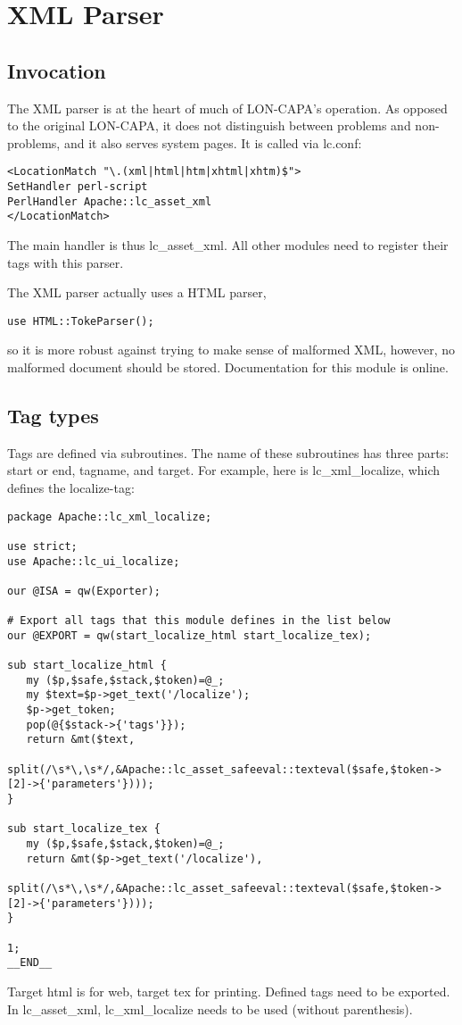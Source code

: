 \chapter{XML Parser}
\section{Invocation}
The XML parser is at the heart of much of LON-CAPA's operation. As opposed to the original LON-CAPA, it does not distinguish between problems and non-problems, and it also serves system pages. It is called via lc.conf:
\begin{verbatim}
<LocationMatch "\.(xml|html|htm|xhtml|xhtm)$">
SetHandler perl-script
PerlHandler Apache::lc_asset_xml
</LocationMatch>
\end{verbatim}
The main handler is thus lc\_asset\_xml. All other modules need to register their tags with this parser.

The XML parser actually uses a HTML parser,
\begin{verbatim}
use HTML::TokeParser();
\end{verbatim}
so it is more robust against trying to make sense of malformed XML, however, no malformed document should be stored. Documentation for this module is online.
\section{Tag types}
Tags are defined via subroutines. The name of these subroutines has three parts: start or end, tagname, and target. For example, here is lc\_xml\_localize, which defines the localize-tag:
\begin{verbatim}
package Apache::lc_xml_localize;

use strict;
use Apache::lc_ui_localize;

our @ISA = qw(Exporter);

# Export all tags that this module defines in the list below
our @EXPORT = qw(start_localize_html start_localize_tex);

sub start_localize_html {
   my ($p,$safe,$stack,$token)=@_;
   my $text=$p->get_text('/localize');
   $p->get_token;
   pop(@{$stack->{'tags'}});
   return &mt($text,
              split(/\s*\,\s*/,&Apache::lc_asset_safeeval::texteval($safe,$token->[2]->{'parameters'})));
}

sub start_localize_tex {
   my ($p,$safe,$stack,$token)=@_;
   return &mt($p->get_text('/localize'),
              split(/\s*\,\s*/,&Apache::lc_asset_safeeval::texteval($safe,$token->[2]->{'parameters'})));
}

1;
__END__
\end{verbatim}
Target html is for web, target tex for printing. Defined tags need to be exported. In lc\_asset\_xml, lc\_xml\_localize needs to be used (without parenthesis).

